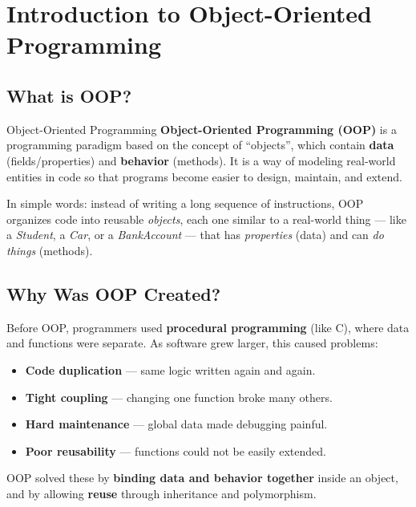 \documentclass[11pt,a4paper]{article}
\begin{document}
\tableofcontents
\clearpage

\section{Introduction to Object-Oriented Programming}

\subsection{What is OOP?}

\begin{defnBox}{Object-Oriented Programming}
\textbf{Object-Oriented Programming (OOP)} is a programming paradigm based on the concept of ``objects'', which contain \textbf{data} (fields/properties) and \textbf{behavior} (methods). It is a way of modeling real-world entities in code so that programs become easier to design, maintain, and extend.
\end{defnBox}

In simple words: instead of writing a long sequence of instructions, OOP organizes code into reusable \textit{objects}, each one similar to a real-world thing — like a \textit{Student}, a \textit{Car}, or a \textit{BankAccount} — that has \textit{properties} (data) and can \textit{do things} (methods).

\subsection{Why Was OOP Created?}

Before OOP, programmers used \textbf{procedural programming} (like C), where data and functions were separate. As software grew larger, this caused problems:
\begin{itemize}[leftmargin=*]
    \item \textbf{Code duplication} — same logic written again and again.
    \item \textbf{Tight coupling} — changing one function broke many others.
    \item \textbf{Hard maintenance} — global data made debugging painful.
    \item \textbf{Poor reusability} — functions could not be easily extended.
\end{itemize}

OOP solved these by \textbf{binding data and behavior together} inside an object, and by allowing \textbf{reuse} through inheritance and polymorphism.
\end{document}
